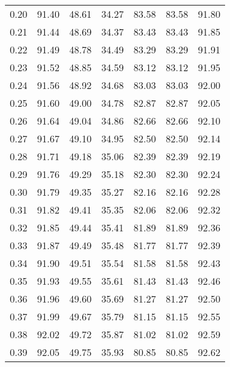 \begin{tabular}{|c|c|c|c|c|c|c|}
      0.20 &     91.40 &     48.61 &      34.27 &   83.58 &      83.58 &         91.80 \\
      0.21 &     91.44 &     48.69 &      34.37 &   83.43 &      83.43 &         91.85 \\
      0.22 &     91.49 &     48.78 &      34.49 &   83.29 &      83.29 &         91.91 \\
      0.23 &     91.52 &     48.85 &      34.59 &   83.12 &      83.12 &         91.95 \\
      0.24 &     91.56 &     48.92 &      34.68 &   83.03 &      83.03 &         92.00 \\
      0.25 &     91.60 &     49.00 &      34.78 &   82.87 &      82.87 &         92.05 \\
      0.26 &     91.64 &     49.04 &      34.86 &   82.66 &      82.66 &         92.10 \\
      0.27 &     91.67 &     49.10 &      34.95 &   82.50 &      82.50 &         92.14 \\
      0.28 &     91.71 &     49.18 &      35.06 &   82.39 &      82.39 &         92.19 \\
      0.29 &     91.76 &     49.29 &      35.18 &   82.30 &      82.30 &         92.24 \\
      0.30 &     91.79 &     49.35 &      35.27 &   82.16 &      82.16 &         92.28 \\
      0.31 &     91.82 &     49.41 &      35.35 &   82.06 &      82.06 &         92.32 \\
      0.32 &     91.85 &     49.44 &      35.41 &   81.89 &      81.89 &         92.36 \\
      0.33 &     91.87 &     49.49 &      35.48 &   81.77 &      81.77 &         92.39 \\
      0.34 &     91.90 &     49.51 &      35.54 &   81.58 &      81.58 &         92.43 \\
      0.35 &     91.93 &     49.55 &      35.61 &   81.43 &      81.43 &         92.46 \\
      0.36 &     91.96 &     49.60 &      35.69 &   81.27 &      81.27 &         92.50 \\
      0.37 &     91.99 &     49.67 &      35.79 &   81.15 &      81.15 &         92.55 \\
      0.38 &     92.02 &     49.72 &      35.87 &   81.02 &      81.02 &         92.59 \\
      0.39 &     92.05 &     49.75 &      35.93 &   80.85 &      80.85 &         92.62 \\

\end{tabular}
